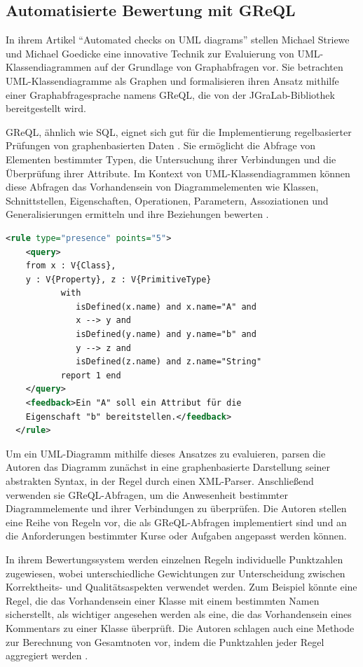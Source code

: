 \subsection{Automatisierte Bewertung mit GReQL}

In ihrem Artikel ``Automated checks on UML diagrams'' \cite{striewe2011automated} stellen Michael Striewe und Michael Goedicke eine innovative Technik zur Evaluierung von UML-Klassendiagrammen auf der Grundlage von Graphabfragen vor. Sie betrachten UML-Klassendiagramme als Graphen und formalisieren ihren Ansatz mithilfe einer Graphabfragesprache namens GReQL, die von der JGraLab-Bibliothek bereitgestellt wird.

\ac{GReQL}, ähnlich wie SQL, eignet sich gut für die Implementierung regelbasierter Prüfungen von graphenbasierten Daten \cite{striewe2014automated}. Sie ermöglicht die Abfrage von Elementen bestimmter Typen, die Untersuchung ihrer Verbindungen und die Überprüfung ihrer Attribute. Im Kontext von UML-Klassendiagrammen können diese Abfragen das Vorhandensein von Diagrammelementen wie Klassen, Schnittstellen, Eigenschaften, Operationen, Parametern, Assoziationen und Generalisierungen ermitteln und ihre Beziehungen bewerten \cite{striewe2011automated}.

\begin{lstlisting}[caption={[Codebeispiel] Codebeispiel in GReQL}, label=code:GreQL, float=!ht, language=xml]
  <rule type="presence" points="5">
    <query>
    from x : V{Class},
    y : V{Property}, z : V{PrimitiveType}
           with
              isDefined(x.name) and x.name="A" and
              x --> y and
              isDefined(y.name) and y.name="b" and
              y --> z and
              isDefined(z.name) and z.name="String"
           report 1 end
    </query>
    <feedback>Ein "A" soll ein Attribut für die
    Eigenschaft "b" bereitstellen.</feedback>
  </rule>
\end{lstlisting}

Um ein UML-Diagramm mithilfe dieses Ansatzes zu evaluieren, parsen die Autoren das Diagramm zunächst in eine graphenbasierte Darstellung seiner abstrakten Syntax, in der Regel durch einen XML-Parser. Anschließend verwenden sie \ac{GReQL}-Abfragen, um die Anwesenheit bestimmter Diagrammelemente und ihrer Verbindungen zu überprüfen. Die Autoren stellen eine Reihe von Regeln vor, die als \ac{GReQL}-Abfragen implementiert sind und an die Anforderungen bestimmter Kurse oder Aufgaben angepasst werden können.

In ihrem Bewertungssystem werden einzelnen Regeln individuelle Punktzahlen zugewiesen, wobei unterschiedliche Gewichtungen zur Unterscheidung zwischen Korrektheits- und Qualitätsaspekten verwendet werden. Zum Beispiel könnte eine Regel, die das Vorhandensein einer Klasse mit einem bestimmten Namen sicherstellt, als wichtiger angesehen werden als eine, die das Vorhandensein eines Kommentars zu einer Klasse überprüft. Die Autoren schlagen auch eine Methode zur Berechnung von Gesamtnoten vor, indem die Punktzahlen jeder Regel aggregiert werden \cite{striewe2011automated}.

